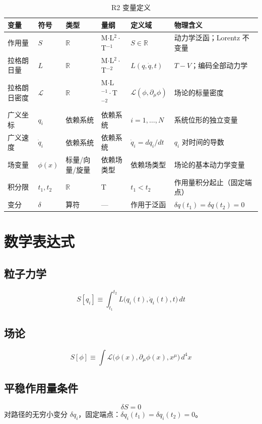 \begin{table}[h]
\centering
\small
\begin{tabular}{p{2cm}p{2cm}p{2.2cm}p{1.8cm}p{3cm}p{4cm}}
\toprule
\textbf{变量} & \textbf{符号} & \textbf{类型} & \textbf{量纲} & \textbf{定义域} & \textbf{物理含义} \\
\midrule
作用量 & $S$ & $\mathbb{R}$ & M$\cdot$L$^2\cdot$T$^{-1}$ & $S \in \mathbb{R}$ & 动力学泛函；Lorentz 不变量 \\
拉格朗日量 & $L$ & $\mathbb{R}$ & M$\cdot$L$^2\cdot$T$^{-2}$ & $L(q,\dot{q},t)$ & $T-V$；编码全部动力学 \\
拉格朗日密度 & $\mathcal{L}$ & $\mathbb{R}$ & M$\cdot$L$^{-1}\cdot$T$^{-2}$ & $\mathcal{L}(\phi,\partial_\mu\phi)$ & 场论的标量密度 \\
广义坐标 & $q_i$ & 依赖系统 & 依赖系统 & $i=1,\dots,N$ & 系统位形的独立变量 \\
广义速度 & $\dot{q}_i$ & 依赖系统 & 依赖系统 & $\dot{q}_i = dq_i/dt$ & $q_i$ 对时间的导数 \\
场变量 & $\phi(x)$ & 标量/向量/旋量 & 依赖场类型 & 依赖场类型 & 场论的基本动力学变量 \\
积分限 & $t_1, t_2$ & $\mathbb{R}$ & T & $t_1 < t_2$ & 作用量积分起止（固定端点） \\
变分 & $\delta$ & 算符 & — & 作用于泛函 & $\delta q(t_1)=\delta q(t_2)=0$ \\
\bottomrule
\end{tabular}
\caption{R2 变量定义}
\end{table}

\section{数学表达式}

\subsection{粒子力学}
\[
S[q_i] \equiv \int_{t_1}^{t_2} L\big(q_i(t), \dot{q}_i(t), t\big)\, dt
\]

\subsection{场论}
\[
S[\phi] \equiv \int \mathcal{L}\big(\phi(x), \partial_\mu\phi(x), x^\mu\big)\, d^4x
\]

\subsection{平稳作用量条件}
\[
\delta S = 0
\]
对路径的无穷小变分 $\delta q_i$，固定端点：$\delta q_i(t_1) = \delta q_i(t_2) = 0$。

